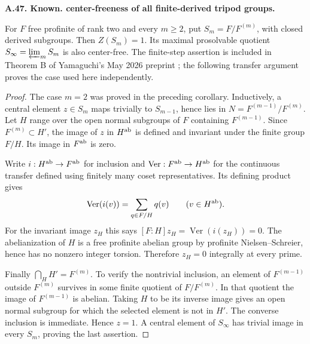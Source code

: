 \documentclass[11pt,oneside]{article}
\makeatletter
\newcounter{statementanchor}
\newenvironment{statement}[3]{%
 \refstepcounter{statementanchor}\def\@currentlabel{#1}%
 \par\addvspace{9pt}\noindent
 \textbf{#1. #2. #3.}\par\nobreak\noindent\ignorespaces
}{\par\addvspace{5pt}}
\makeatother
\begin{document}
\begin{statement}{A.47}{Known}{center-freeness of all finite-derived tripod groups}
\label{st:A.47}
\label{A:solvable-centers}
For $F$ free profinite of rank two and every $m\ge2$, put
$S_m=F/F^{(m)}$, with closed derived subgroups. Then
$Z(S_m)=1$. Its maximal prosolvable quotient
$S_\infty=\varprojlim_m S_m$ is also center-free.
The finite-step assertion is included in Theorem B of
Yamaguchi's May 2026 preprint \cite{A_Yamaguchi2026Centers};
the following transfer argument proves the case used here
independently.
\end{statement}
\begin{proof}
The case $m=2$ was proved in the preceding corollary.
Inductively, a central element $z\in S_m$ maps trivially
to $S_{m-1}$, hence lies in
$N=F^{(m-1)}/F^{(m)}$. Let $H$ range over the open normal
subgroups of $F$ containing $F^{(m-1)}$. Since
$F^{(m)}\subset H'$, the image of $z$ in $H^{\rm ab}$
is defined and invariant under the finite group $F/H$.
Its image in $F^{\rm ab}$ is zero.

Write $i:H^{\rm ab}\to F^{\rm ab}$ for inclusion and
$\operatorname{Ver}:F^{\rm ab}\to H^{\rm ab}$ for the
continuous transfer defined using finitely many coset
representatives. Its defining product gives
\[
 \operatorname{Ver}(i(v))=\sum_{q\in F/H}q(v)
 \qquad(v\in H^{\rm ab}).
\]
For the invariant image $z_H$ this says
$[F:H]z_H=\operatorname{Ver}(i(z_H))=0$.
The abelianization of $H$ is a free profinite abelian group
by profinite Nielsen--Schreier, hence has no nonzero
integer torsion. Therefore $z_H=0$ integrally at every
prime.

Finally
$\bigcap_H H'=F^{(m)}$. To verify the nontrivial inclusion,
an element of $F^{(m-1)}$ outside $F^{(m)}$ survives in
some finite quotient of $F/F^{(m)}$. In that quotient the
image of $F^{(m-1)}$ is abelian. Taking $H$ to be its
inverse image gives an open normal subgroup for which the
selected element is not in $H'$. The converse inclusion
is immediate. Hence $z=1$. A central element of
$S_\infty$ has trivial image in every $S_m$, proving the
last assertion.
\end{proof}
\end{document}
